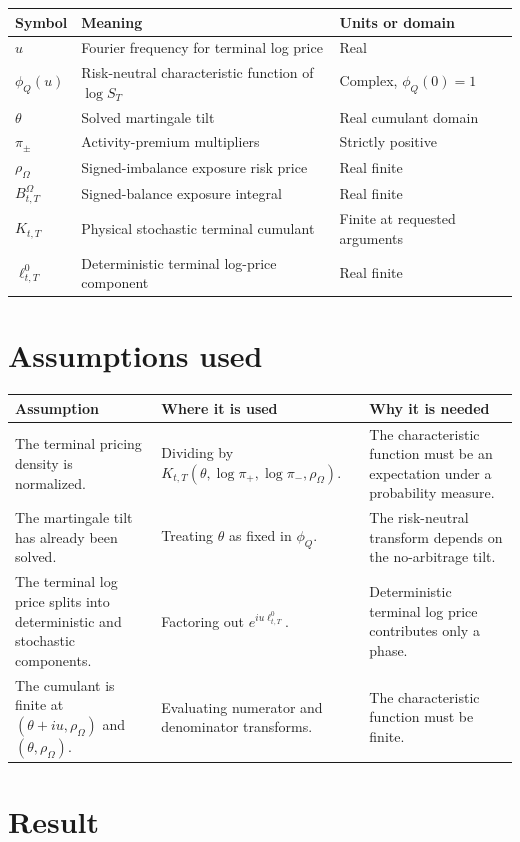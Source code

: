 \documentclass[11pt]{article}
\begin{document}
\begin{tabularx}{\textwidth}{lXX}
\toprule
Symbol & Meaning & Units or domain\\
\midrule
\(u\) & Fourier frequency for terminal log price & Real\\
\(\phi_Q(u)\) & Risk-neutral characteristic function of \(\log S_T\) & Complex, \(\phi_Q(0)=1\)\\
\(\theta\) & Solved martingale tilt & Real cumulant domain\\
\(\pi_\pm\) & Activity-premium multipliers & Strictly positive\\
\(\rho_\Omega\) & Signed-imbalance exposure risk price & Real finite\\
\(B_{t,T}^{\Omega}\) & Signed-balance exposure integral & Real finite\\
\(K_{t,T}\) & Physical stochastic terminal cumulant & Finite at requested arguments\\
\(\ell_{t,T}^{0}\) & Deterministic terminal log-price component & Real finite\\
\bottomrule
\end{tabularx}

\section{Assumptions used}

\begin{tabularx}{\textwidth}{XXX}
\toprule
Assumption & Where it is used & Why it is needed\\
\midrule
The terminal pricing density is normalized.
& Dividing by \(K_{t,T}(\theta,\log\pi_+,\log\pi_-,\rho_\Omega)\).
& The characteristic function must be an expectation under a probability measure.\\
The martingale tilt has already been solved.
& Treating \(\theta\) as fixed in \(\phi_Q\).
& The risk-neutral transform depends on the no-arbitrage tilt.\\
The terminal log price splits into deterministic and stochastic components.
& Factoring out \(e^{iu\ell_{t,T}^{0}}\).
& Deterministic terminal log price contributes only a phase.\\
The cumulant is finite at \((\theta+iu,\rho_\Omega)\) and \((\theta,\rho_\Omega)\).
& Evaluating numerator and denominator transforms.
& The characteristic function must be finite.\\
\bottomrule
\end{tabularx}

\section{Result}
\end{document}

